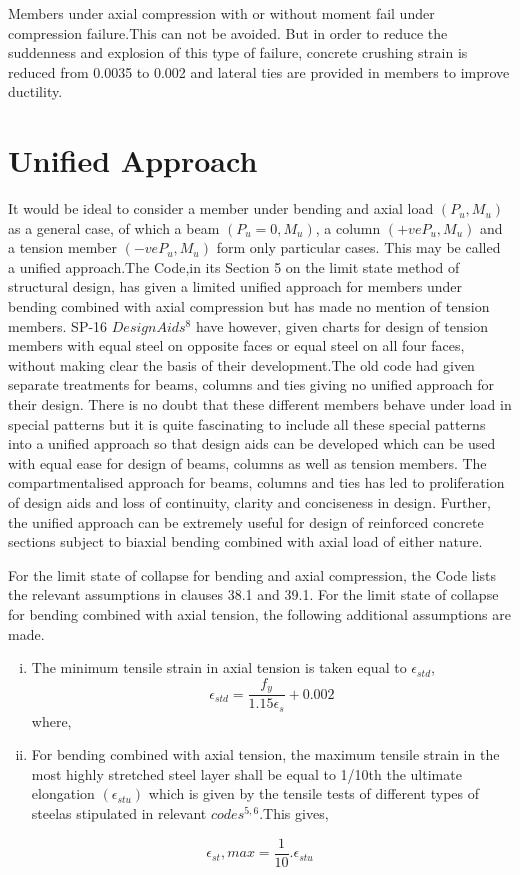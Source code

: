 Members under axial compression with or without moment fail under
compression failure.This can not be avoided. But in order to reduce the
suddenness and explosion of this type of failure, concrete crushing
strain is reduced from 0.0035 to 0.002 and lateral ties are provided
in members to improve ductility.

\section{Unified Approach}

It would be ideal to consider a member under bending and axial load
$(P_u, M_u)$ as a general case, of which a beam $(P_u=0,M_u)$, a column
$(+ve P_u,M_u)$ and a tension member $(-ve P_u,M_u)$ form only particular
cases. This may be called a uniﬁed approach.The Code,in its Section 5 on
the limit state method of structural design, has given a limited uniﬁed
approach for members under bending combined with axial compression but
has made no mention of tension members. SP-16 $Design Aids^8$ have
however, given charts for design of tension members with equal steel on
opposite faces or equal steel on all four faces, without making clear the
basis of their development.The old code had given separate treatments for
beams, columns and ties giving no unified approach for their design. There
is no doubt that these different members behave under load in special
patterns but it is quite fascinating to include all these special
patterns into a unified approach so that design aids can be developed
which can be used with equal ease for design of beams, columns as well 
as tension members. The compartmentalised approach for beams, columns
and ties has led to proliferation of design aids and loss of continuity,
clarity and conciseness in design. Further, the unified approach can be
extremely useful for design of reinforced concrete sections subject to
biaxial bending combined with axial load of either nature.

For the limit state of collapse for bending and axial compression, the
Code lists the relevant assumptions in clauses 38.1 and 39.1. For the
limit state of collapse for bending combined with axial tension, the
following additional assumptions are made.

\begin{enumerate}[(i)]
\item The minimum tensile strain in axial tension is taken equal to
$\epsilon_{std}$,
\begin{equation}
\epsilon_{std}=\frac{f_y}{1.15{\epsilon_s}}+0.002
\end{equation}
where, 
\item  For bending combined with axial tension, the maximum tensile
strain in the most highly stretched steel layer shall be equal to 1/10th
the ultimate elongation $(\epsilon_{stu})$ which is given by the tensile
tests of different types of steelas stipulated in relevant
$codes^{5,6}$.This gives,
\end{enumerate}
\begin{equation}
\epsilon_{st},max=\frac{1}{10}.\epsilon_{stu}
\end{equation}

